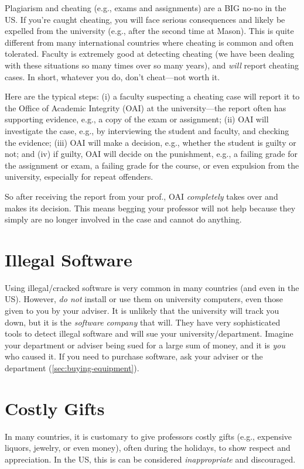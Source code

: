 \documentclass[oneside,11pt,dvipsnames]{book}
\begin{document}
Plagiarism and cheating (e.g., exams and assignments) are a BIG no-no in the US.  If you're caught cheating, you will face serious consequences and likely be expelled from the university (e.g., after the second time at Mason).   This is quite different from many international countries where cheating is common and often tolerated.  Faculty is extremely good at detecting cheating (we have been dealing with these situations so many times over so many years), and \emph{will} report cheating cases.  In short, whatever you do, don't cheat---not worth it.

Here are the typical steps: (i) a faculty suspecting a cheating case will report it to the Office of Academic Integrity (OAI) at the university---the report often has supporting evidence, e.g., a copy of the exam or assignment; (ii) OAI will investigate the case, e.g., by interviewing the student and faculty, and checking the evidence; (iii) OAI will make a decision, e.g., whether the student is guilty or not; and (iv) if guilty, OAI will decide on the punishment, e.g., a failing grade for the assignment or exam, a failing grade for the course, or even expulsion from the university, especially for repeat offenders.

So after receiving the report from your prof., OAI \emph{completely} takes over and makes its decision. This means begging your professor will not help because they simply are no longer involved in the case and cannot do anything.

\section{Illegal Software}\label{sec:illegal-software}
 Using illegal/cracked software is very common in many countries (and even in the US). However, \emph{do not} install or use them on university computers, even those given to you by your adviser.  It is unlikely that the university will track you down, but it is the \emph{software company} that will.  They have very sophisticated tools to detect illegal software and will sue your university/department.  Imagine your department or adviser being sued for a large sum of money, and it is \emph{you} who caused it.  If you need to purchase software,  ask your adviser or the department (\autoref{sec:buying-equipment}).


\section{Costly Gifts}\label{sec:gifts} In many countries, it is customary to give professors costly gifts (e.g., expensive liquors, jewelry, or even money), often during the holidays, to show respect and appreciation.  In the US, this is can be considered \emph{inappropriate} and discouraged. 
\end{document}
